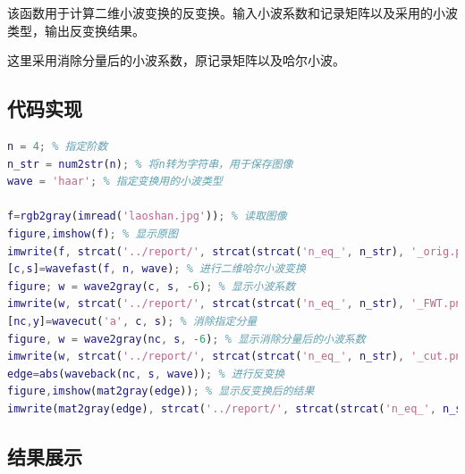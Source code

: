 \documentclass[UTF8]{ctexart}
\begin{document}
                \indent 该函数用于计算二维小波变换的反变换。输入小波系数和记录矩阵以及采用的小波类型，输出反变换结果。
                
                \indent 这里采用消除分量后的小波系数，原记录矩阵以及哈尔小波。
            
        \subsection{代码实现}
           
             \begin{lstlisting}[language=Matlab,caption={$wavetest$代码},label={broadcast.cpp}]
n = 4; % 指定阶数
n_str = num2str(n); % 将n转为字符串，用于保存图像
wave = 'haar'; % 指定变换用的小波类型

f=rgb2gray(imread('laoshan.jpg')); % 读取图像
figure,imshow(f); % 显示原图
imwrite(f, strcat('../report/', strcat(strcat('n_eq_', n_str), '_orig.png')))% 保存原图
[c,s]=wavefast(f, n, wave); % 进行二维哈尔小波变换
figure; w = wave2gray(c, s, -6); % 显示小波系数
imwrite(w, strcat('../report/', strcat(strcat('n_eq_', n_str), '_FWT.png')))% 保存变换结果
[nc,y]=wavecut('a', c, s); % 消除指定分量
figure, w = wave2gray(nc, s, -6); % 显示消除分量后的小波系数
imwrite(w, strcat('../report/', strcat(strcat('n_eq_', n_str), '_cut.png')))% 保存消除分量后的结果
edge=abs(waveback(nc, s, wave)); % 进行反变换
figure,imshow(mat2gray(edge)); % 显示反变换后的结果
imwrite(mat2gray(edge), strcat('../report/', strcat(strcat('n_eq_', n_str), '_edge.png')))% 保存变换结果


              \end{lstlisting}
    

        \subsection{结果展示}
        
\end{document}
